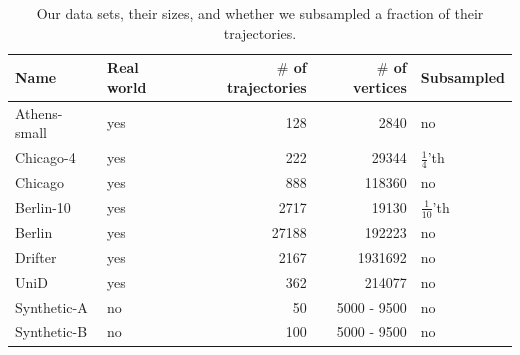 \begin{table}[h]
    \centering {}
    \begin{tabular}{@{}llrrl@{}}
    \toprule
      \textbf{Name} & \textbf{Real world} & \textbf{$\#$ of trajectories} & \textbf{$\#$ of vertices} & \textbf{Subsampled}  \\
      \midrule
        Athens-small & yes & 128           & 2840 & no \\
        Chicago-4 & yes & 222         & 29344 & $\frac{1}{4}$'th  \\
        Chicago & yes & 888         & 118360 & no \\
        Berlin-10 & yes & 2717         & 19130 & $\frac{1}{10}$'th  \\
        Berlin & yes & 27188        & 192223 & no \\
        Drifter & yes & 2167       & 1931692 & no \\
        UniD & yes & 362        & 214077 & no \\
        Synthetic-A & no & 50 & 5000 - 9500 & no\\
        Synthetic-B & no & 100 &  5000 - 9500 & no \\
        \bottomrule
    \end{tabular}
    \caption{Our data sets, their sizes, and whether we subsampled a fraction of their trajectories.}
        \label{tab:data_sets}
    \label{tab:my_label}
\end{table}
%
\clearpage 
%
